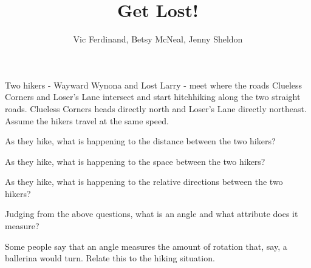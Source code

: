 \documentclass{ximera}
\title{Get Lost!}
\author{Vic Ferdinand, Betsy McNeal, Jenny Sheldon}
\begin{document}
\begin{abstract}
\end{abstract}
\maketitle



Two hikers - Wayward Wynona and Lost Larry - meet where the roads Clueless Corners and Loser's Lane intersect and start hitchhiking along the two straight roads.  Clueless Corners heads directly north and Loser’s Lane directly northeast.  Assume the hikers travel at the same speed.

\begin{center}
\end{center}

\begin{problem} \label{GetLost1}
As they hike, what is happening to the distance between the two hikers?

\end{problem}

\begin{problem} \label{GetLost2}
As they hike, what is happening to the space between the two hikers?

\end{problem}

\begin{problem} \label{GetLost3}
As they hike, what is happening to the relative directions between the two hikers?

\end{problem}

\begin{problem} \label{GetLost4}
Judging from the above questions, what is an angle and what attribute does it measure?


\end{problem}


\begin{problem} \label{GetLost5}
Some people say that an angle measures the amount of rotation that, say, a ballerina would turn. Relate this to the hiking situation.

\end{problem}   
\end{document}
